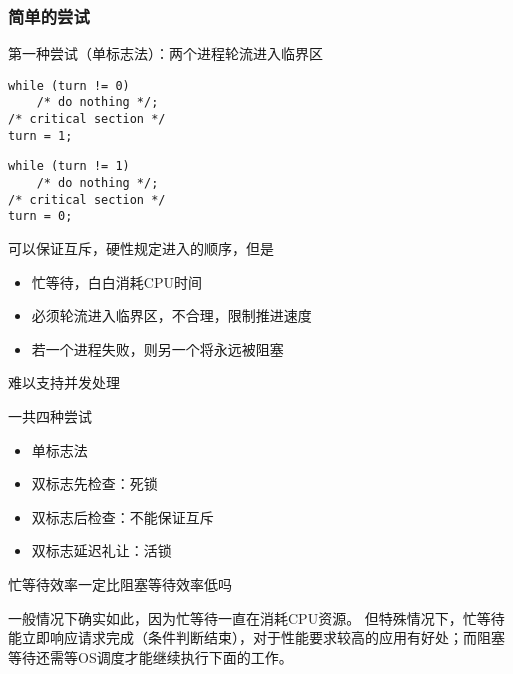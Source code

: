 \subsubsection{简单的尝试}
第一种尝试（单标志法）：两个进程轮流进入临界区

\begin{minipage}{0.5\linewidth}
\begin{lstlisting}
while (turn != 0)
    /* do nothing */;
/* critical section */
turn = 1;
\end{lstlisting}
\end{minipage}
\begin{minipage}{0.5\linewidth}
\begin{lstlisting}
while (turn != 1)
    /* do nothing */;
/* critical section */
turn = 0;
\end{lstlisting}
\end{minipage}

可以保证互斥，硬性规定进入的顺序，但是
\begin{itemize}
    \item 忙等待，白白消耗CPU时间
    \item 必须轮流进入临界区，不合理，限制推进速度
    \item 若一个进程失败，则另一个将永远被阻塞
\end{itemize}
难以支持并发处理

一共四种尝试
\begin{itemize}
    \item 单标志法
    \item 双标志先检查：死锁
    \item 双标志后检查：不能保证互斥
    \item 双标志延迟礼让：活锁
\end{itemize}

\begin{example}
    忙等待效率一定比阻塞等待效率低吗
\end{example}
\begin{analysis}
    一般情况下确实如此，因为忙等待一直在消耗CPU资源。
    但特殊情况下，忙等待能立即响应请求完成（条件判断结束），对于性能要求较高的应用有好处；而阻塞等待还需等OS调度才能继续执行下面的工作。
\end{analysis}


